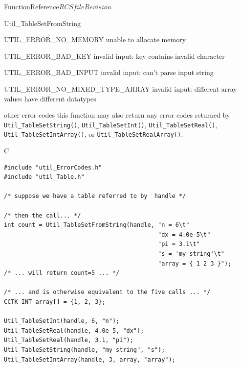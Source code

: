 \begin{cactuspart}{FunctionReference}{$RCSfile$}{$Revision$}
\begin{FunctionDescription}{Util\_TableSetFromString}
\begin{ErrorSection}
\begin{Error}{UTIL\_ERROR\_NO\_MEMORY}
unable to allocate memory
\end{Error}
\begin{Error}{UTIL\_ERROR\_BAD\_KEY}
invalid input: key contains invalid character
\end{Error}
\begin{Error}{UTIL\_ERROR\_BAD\_INPUT}
invalid input: can't parse input string
\end{Error}
\begin{Error}{UTIL\_ERROR\_NO\_MIXED\_TYPE\_ARRAY}
invalid input: different array values have different datatypes
\end{Error}
\begin{Error}{\rm other error codes}
this function may also return any error codes returned by
\verb|Util_TableSetString()|, \verb|Util_TableSetInt()|,
\verb|Util_TableSetReal()|, \verb|Util_TableSetIntArray()|,
or \verb|Util_TableSetRealArray()|.
\end{Error}
\end{ErrorSection}

\begin{ExampleSection}
\begin{Example}{C}
\begin{verbatim}
#include "util_ErrorCodes.h"
#include "util_Table.h"

/* suppose we have a table referred to by  handle */

/* then the call... */
int count = Util_TableSetFromString(handle, "n = 6\t"
                                            "dx = 4.0e-5\t"
                                            "pi = 3.1\t"
                                            "s = 'my string'\t"
                                            "array = { 1 2 3 }");
/* ... will return count=5 ... */

/* ... and is otherwise equivalent to the five calls ... */
CCTK_INT array[] = {1, 2, 3};

Util_TableSetInt(handle, 6, "n");
Util_TableSetReal(handle, 4.0e-5, "dx");
Util_TableSetReal(handle, 3.1, "pi");
Util_TableSetString(handle, "my string", "s");
Util_TableSetIntArray(handle, 3, array, "array");
\end{verbatim}
\end{Example}
\end{ExampleSection}
\end{FunctionDescription}



\end{cactuspart}
